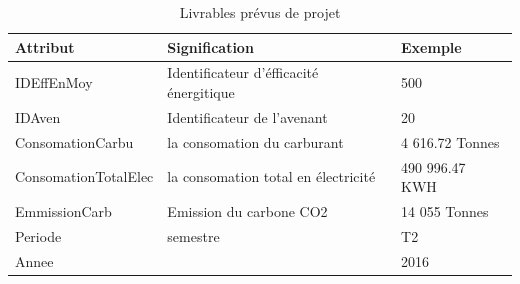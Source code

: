 \documentclass[a4paper]{report}
\begin{document}
\begin{doublespace}
	\begin{table}[H]
		\begin{center}
			\begin{tabularx}{17.5cm}{|X|X|X|}
				\hline
				\textbf{Attribut}    & \textbf{Signification}                  &
				\textbf{Exemple}                                                          \\
				\hline
				IDEffEnMoy           & Identificateur d'éfficacité énergitique &
				500                                                                       \\
				\hline
				IDAven               & Identificateur de l'avenant             & 20       \\
				\hline
				ConsomationCarbu     & la consomation du carburant             & 4 616.72
				Tonnes                                                                    \\
				\hline
				ConsomationTotalElec & la consomation total en électricité     & 490
				996.47 KWH                                                                \\
				\hline
				EmmissionCarb        & Emission du carbone CO2                 & 14 055
				Tonnes                                                                    \\
				\hline
				Periode              & semestre                                & T2       \\
				\hline
				Annee                &                                         & 2016     \\
				\hline
			\end{tabularx}
			\caption{Livrables prévus de projet}
		\end{center}
	\end{table}
	

\end{doublespace}
\end{document}
